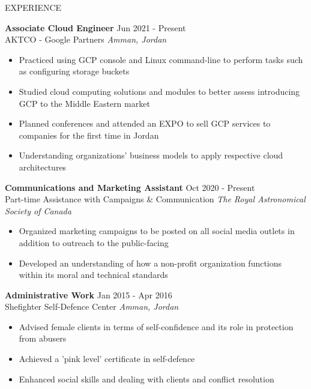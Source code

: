 \documentclass{resume}
\begin{document}
\begin{rSection}{EXPERIENCE}

\textbf{Associate Cloud Engineer} \hfill Jun 2021 - Present\\
AKTCO - Google Partners \hfill \textit{Amman, Jordan} 
 \begin{itemize}
    \itemsep -3pt {} 
     \item Practiced using GCP console and Linux command-line to perform tasks such as configuring storage buckets
     \item Studied cloud computing solutions and modules to better assess introducing GCP to the Middle Eastern market
     \item Planned conferences and attended an EXPO to sell GCP services to companies for the first time in Jordan
     \item Understanding organizations' business models to apply respective cloud architectures
 \end{itemize}

\textbf{Communications and Marketing Assistant} \hfill Oct 2020 - Present\\
Part-time Assistance with Campaigns \& Communication \hfill \textit{The Royal Astronomical Society of Canada} 
 \begin{itemize}
    \itemsep -3pt {} 
     \item Organized marketing campaigns to be posted on all social media outlets in addition to outreach to the public-facing
     \item Developed an understanding of how a non-profit organization functions within its moral and technical standards
 \end{itemize}
 
 
\textbf{Administrative Work} \hfill Jan 2015 - Apr 2016\\
Shefighter Self-Defence Center \hfill \textit{Amman, Jordan} 

 \begin{itemize}
    \itemsep -3pt {} 
     \item Advised female clients in terms of self-confidence and its role in protection from abusers
     \item Achieved a 'pink level' certificate in self-defence
     \item Enhanced social skills and dealing with clients and conflict resolution
 \end{itemize}

\end{rSection} 
\end{document}
